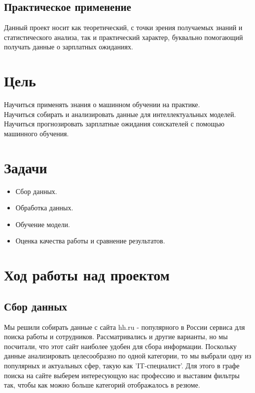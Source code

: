 \documentclass{article}
\begin{document}
\subsection{Практическое применение}
Данный проект носит как теоретический, с точки зрения получаемых знаний и статистического анализа, так и практический характер, буквально помогающий получать данные о зарплатных ожиданиях. 
 

\section{Цель}
 Научиться применять знания о машинном обучении на практике.\\ Научиться собирать и анализировать данные для интеллектуальных моделей.\\ Научиться прогнозировать зарплатные ожидания соискателей с помощью машинного обучения.

\bigskip
\section{Задачи}
\begin{itemize}
  \color{red}
  \item \color{black} Сбор данных.
    \color{red}
  \item \color{black} Обработка данных.
  \color{red}
  \item \color{black} Обучение модели.
  \color{red}
  \item \color{black} Оценка качества работы и сравнение результатов.

  
\end{itemize}

\section{Ход работы над проектом}

\subsection{Сбор данных}
\color{black}
Мы решили собирать данные с сайта hh.ru\cite{WEBSITE:1} - популярного в России сервиса для поиска работы и сотрудников. Рассматривались и другие варианты, но мы посчитали, что этот сайт наиболее удобен для сбора информации. Поскольку данные анализировать целесообразно по одной категории, то мы выбрали одну из популярных и актуальных сфер, такую как 'IT-специалист'.
Для этого в графе поиска на сайте выберем интересующую нас профессию и выставим фильтры так, чтобы как можно больше категорий отображалось в резюме. 
\end{document}
